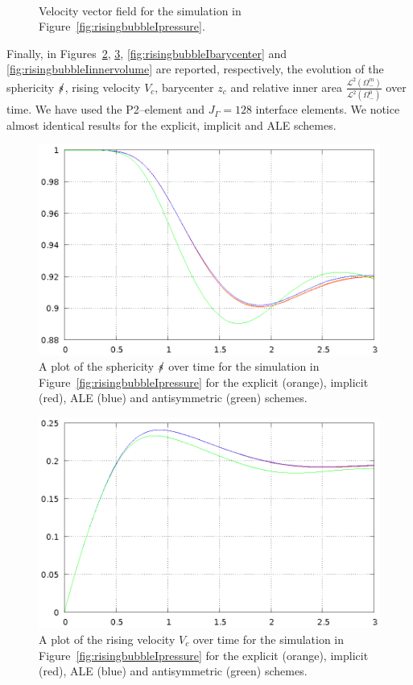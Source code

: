 \begin{figure}[htbp]
\centering
{}
\\
\caption[Navier--Stokes rising bubble I velocity]
{Velocity vector field for the simulation in
Figure~\ref{fig:risingbubbleIpressure}.}
\label{fig:risingbubbleIvelocity}
\end{figure}

Finally, in Figures~\ref{fig:risingbubbleIsphericity},
\ref{fig:risingbubbleIrisingvelocity}, \ref{fig:risingbubbleIbarycenter} and
\ref{fig:risingbubbleIinnervolume} are reported, respectively, the evolution of
the sphericity $\mbox{$s\!\!\!\!\:/$}$, rising velocity $V_c$, barycenter $z_c$ and relative
inner area $\frac{\mathcal{L}^2(\Omega^m_-)}{\mathcal{L}^2(\Omega^0_-)}$ over
time. We have used the P2--\pdg element and $J_\Gamma=128$ interface elements.
We notice almost identical results for the explicit, implicit and ALE schemes.
\begin{figure}[htbp]
\centering
\includegraphics[width=.45\textwidth]
{figures/navier_stokes/rising_bubble_I_sphericity.ps}
\caption[Navier--Stokes rising bubble I sphericity]
{A plot of the sphericity $\mbox{$s\!\!\!\!\:/$}$ over time for the simulation in
Figure~\ref{fig:risingbubbleIpressure} for the explicit (orange), implicit
(red), ALE (blue) and antisymmetric (green) schemes.}
\label{fig:risingbubbleIsphericity}
\end{figure}

\begin{figure}[htbp]
\centering
\includegraphics[width=.45\textwidth]
{figures/navier_stokes/rising_bubble_I_rising_velocity.ps}
\caption[Navier--Stokes rising bubble I rising velocity]
{A plot of the rising velocity $V_c$ over time for the simulation in
Figure~\ref{fig:risingbubbleIpressure} for the explicit (orange), implicit
(red), ALE (blue) and antisymmetric (green) schemes.}
\label{fig:risingbubbleIrisingvelocity}
\end{figure}

